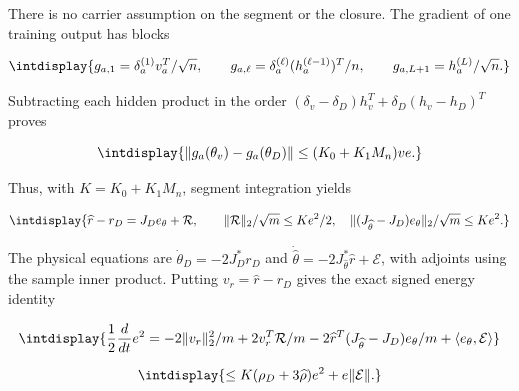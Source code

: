 
There is no carrier assumption on the segment or the closure. The gradient of one training output has blocks


\begingroup\renewcommand{\theHequation}{intdisplay.531}
\begin{equation*}
\intdisplay{
g_{a,1}=\delta_a^{(1)}v_a^T/\sqrt n,\qquad
g_{a,\ell}=\delta_a^{(\ell)}(h_a^{(\ell-1)})^T/n,
\qquad g_{a,L+1}=h_a^{(L)}/\sqrt n.
}
\end{equation*}
\endgroup


Subtracting each hidden product in the order \((\delta_v-\delta_D)h_v^T+\delta_D(h_v-h_D)^T\) proves


\begingroup\renewcommand{\theHequation}{intdisplay.532}
\begin{equation*}
\intdisplay{
\|g_a(\theta_v)-g_a(\theta_D)\|
\le(K_0+K_1M_n)ve.
}
\end{equation*}
\endgroup


Thus, with \(K=K_0+K_1M_n\), segment integration yields


\begingroup\renewcommand{\theHequation}{intdisplay.533}
\begin{equation*}
\intdisplay{
\widehat r-r_D=J_De_\theta+\mathcal R,\qquad
\|\mathcal R\|_2/\sqrt m\le Ke^2/2,
\quad
\|(J_{\widehat\theta}-J_D)e_\theta\|_2/\sqrt m\le Ke^2.
}
\end{equation*}
\endgroup


The physical equations are \(\dot\theta_D=-2J_D^*r_D\) and \(\dot{\widehat\theta}=-2J_{\widehat\theta}^*\widehat r +\mathcal E\), with adjoints using the sample inner product. Putting \(v_r=\widehat r-r_D\) gives the exact signed energy identity


\begingroup\renewcommand{\theHequation}{intdisplay.534}
\begin{equation*}
\intdisplay{
\frac12\frac d{dt}e^2
=-2\|v_r\|_2^2/m+2v_r^T\mathcal R/m
-2\widehat r^T(J_{\widehat\theta}-J_D)e_\theta/m
+\langle e_\theta,\mathcal E\rangle
}
\end{equation*}
\endgroup

\begingroup\renewcommand{\theHequation}{intdisplay.535}
\begin{equation*}
\intdisplay{
\le K(\rho_D+3\widehat\rho)e^2+e\|\mathcal E\|.
}
\end{equation*}
\endgroup

